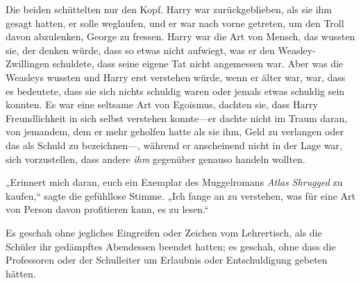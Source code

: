 Die beiden schüttelten nur den Kopf.
Harry war zurückgeblieben, als sie ihm gesagt hatten, er solle weglaufen, und er war nach vorne getreten, um den Troll davon abzulenken, George zu fressen. Harry war die Art von Mensch, das wussten sie, der denken würde, dass so etwas nicht aufwiegt, was er den Weasley-Zwillingen schuldete, dass seine eigene Tat nicht angemessen war. Aber was die Weasleys wussten und Harry erst verstehen würde, wenn er älter war, war, dass es bedeutete, dass sie sich nichts schuldig waren oder jemals etwas schuldig sein konnten. Es war eine seltsame Art von Egoismus, dachten sie, dass Harry Freundlichkeit in sich selbst verstehen konnte—er dachte nicht im Traum daran, von jemandem, dem er mehr geholfen hatte als sie ihm, Geld zu verlangen oder das als Schuld zu bezeichnen—, während er anscheinend nicht in der Lage war, sich vorzustellen, dass andere \emph{ihm} gegenüber genauso handeln wollten.

„Erinnert mich daran, euch ein Exemplar des Muggelromans \emph{Atlas Shrugged} zu kaufen,“ sagte die gefühllose Stimme. „Ich fange an zu verstehen, was für eine Art von Person davon profitieren kann, es zu lesen.“


Es geschah ohne jegliches Eingreifen oder Zeichen vom Lehrertisch, als die Schüler ihr gedämpftes Abendessen beendet hatten; es geschah, ohne dass die Professoren oder der Schulleiter um Erlaubnis oder Entschuldigung gebeten hätten.

